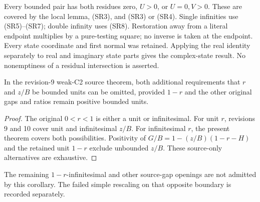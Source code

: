 Every bounded pair has both residues zero, $U>0$, or $U=0,V>0$.
These are covered by the local lemma, (SR3), and (SR3) or (SR4).
Single infinities use (SR5)--(SR7); double infinity uses (SR8).
Restoration away from a literal endpoint multiplies by a pure-testing
square; no inverse is taken at the endpoint. Every state coordinate
and first normal was retained. Applying the real identity separately
to real and imaginary state parts gives the complex-state result.
No nonemptiness of a residual intersection is asserted.

\begin{corollary}
In the revision-9 weak-C2 source theorem, both additional requirements
that $r$ and $z/B$ be bounded units can be omitted, provided $1-r$
and the other original gaps and ratios remain positive bounded units.
\end{corollary}
\begin{proof}
The original $0<r<1$ is either a unit or infinitesimal.
For unit $r$, revisions 9 and 10 cover unit and infinitesimal $z/B$.
For infinitesimal $r$, the present theorem covers both possibilities.
Positivity of $G/B=1-(z/B)(1-r-H)$ and the retained unit $1-r$
exclude unbounded $z/B$. These source-only alternatives are exhaustive.
\end{proof}
The remaining $1-r$-infinitesimal and other source-gap openings
are not admitted by this corollary. The failed simple rescaling on
that opposite boundary is recorded separately.
